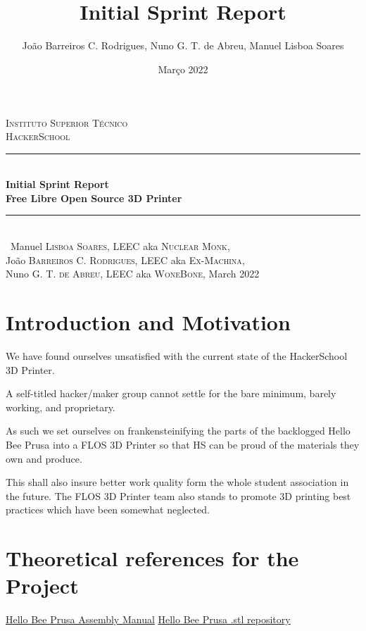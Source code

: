 \documentclass[a4paper,12pt]{article}
\date{Março 2022}
\title{ \\ \large {Initial Sprint Report}}
\author{João Barreiros C. Rodrigues, Nuno G. T. de Abreu, Manuel Lisboa Soares }
\begin{document}
	\begin{titlepage} %
        \newcommand{\HRule}{\rule{\linewidth}{0.5mm}} %
        \center %
        \textsc{\LARGE Instituto Superior Técnico}\\[1.5cm] %
	\textsc{\Large HackerSchool}\\[0.25cm]
        \HRule\\[0.4cm]
        {\LARGE\bfseries Initial Sprint Report}\\[0.4cm] %
	{\huge\bfseries Free Libre Open Source 3D Printer}\\[0.4cm] %
        \HRule\\[1.5cm]\
	Manuel \textsc{Lisboa Soares}, LEEC aka \textsc{Nuclear Monk},\\
        João \textsc{Barreiros C. Rodrigues}, LEEC aka \textsc{Ex-Machina},\\
	Nuno \textsc{G. T. de Abreu}, LEEC aka \textsc{WoneBone},
        \vfill\vfill\vfill %
        {\large March 2022} %
        \vfill %
\end{titlepage}
	\newpage
		\tableofcontents
	\section{Introduction and Motivation}
	\par
	We have found ourselves unsatisfied with the current state of the HackerSchool 3D Printer. \par
	A self-titled hacker/maker group cannot settle for the bare minimum, barely  working, and proprietary. \par
	As such we set ourselves on frankensteinifying the parts of the backlogged Hello Bee Prusa into a FLOS 3D Printer so that HS can be proud of the materials they own and produce.\par
	This shall also insure better work quality form the whole student association in the future. The FLOS 3D Printer team also stands to promote 3D printing best practices which have been somewhat neglected.
	\section{Theoretical references for the Project}
	\par
	\href{https://www.manualslib.com/manual/1051705/Beeverycreative-Hello-Bee-Prusa.html?page=2#manual}{Hello Bee Prusa Assembly Manual} \newline
	\href{https://github.com/beeverycreative/helloBEEprusa-hardware/tree/master/helloBEEprusa-printed_parts}{Hello Bee Prusa .stl repository} \par
	\clearpage	
\end{document}
